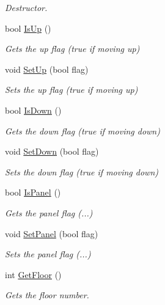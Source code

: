 \begin{DoxyCompactItemize}
\begin{DoxyCompactList}\small\item\em Destructor. \end{DoxyCompactList}\item 
bool \hyperlink{class_c_floor_a2d23e56c8799fe99e18436f71aad84e5}{Is\+Up} ()
\begin{DoxyCompactList}\small\item\em Gets the up flag (true if moving up) \end{DoxyCompactList}\item 
void \hyperlink{class_c_floor_a130545e2b7d76da50bf6413fc704cfa7}{Set\+Up} (bool flag)
\begin{DoxyCompactList}\small\item\em Sets the up flag (true if moving up) \end{DoxyCompactList}\item 
bool \hyperlink{class_c_floor_aef3cf57dbac94449f936517715fbfe38}{Is\+Down} ()
\begin{DoxyCompactList}\small\item\em Gets the down flag (true if moving down) \end{DoxyCompactList}\item 
void \hyperlink{class_c_floor_aa9c11f1b254e2036169c64738a1b1ba4}{Set\+Down} (bool flag)
\begin{DoxyCompactList}\small\item\em Sets the down flag (true if moving down) \end{DoxyCompactList}\item 
bool \hyperlink{class_c_floor_abe6e792f63d6bd19ab7736acbb62d3db}{Is\+Panel} ()
\begin{DoxyCompactList}\small\item\em Gets the panel flag (...) \end{DoxyCompactList}\item 
void \hyperlink{class_c_floor_a3eb3317a74f098cd7a177d097ca84f86}{Set\+Panel} (bool flag)
\begin{DoxyCompactList}\small\item\em Sets the panel flag (...) \end{DoxyCompactList}\item 
int \hyperlink{class_c_floor_abff3a5ae38b20daaef8acffe46bc5b29}{Get\+Floor} ()
\begin{DoxyCompactList}\small\item\em Gets the floor number. \end{DoxyCompactList}\item 

\end{DoxyCompactItemize}
